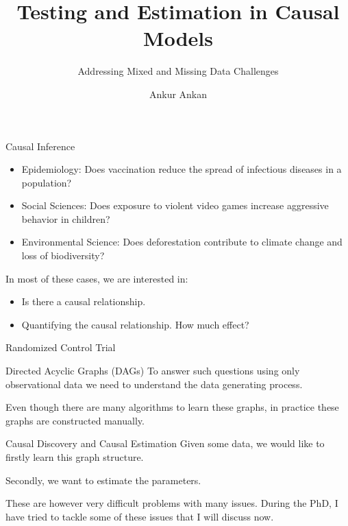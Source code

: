 \documentclass[aspectratio=169]{beamer}
\begin{document}
\title{Testing and Estimation in Causal Models}
\subtitle{Addressing Mixed and Missing Data Challenges}
\author{Ankur Ankan}
\date{}

\maketitle

\begin{frame}{Causal Inference}

	\begin{itemize}
		\item Epidemiology: Does vaccination reduce the spread of infectious diseases in a population?
		\item Social Sciences: Does exposure to violent video games increase aggressive behavior in children?
		\item Environmental Science: Does deforestation contribute to climate change and loss of biodiversity?
	\end{itemize}

	In most of these cases, we are interested in:
	\begin{itemize}
		\item Is there a causal relationship.
		\item Quantifying the causal relationship. How much effect?
	\end{itemize}
\end{frame}

\begin{frame}{Randomized Control Trial}

\end{frame}

\begin{frame}{Directed Acyclic Graphs (DAGs)}
	To answer such questions using only observational data we need to understand the data generating process.


	Even though there are many algorithms to learn these graphs, in practice these graphs are constructed manually.
\end{frame}

\begin{frame}{Causal Discovery and Causal Estimation}
	Given some data, we would like to firstly learn this graph structure.

	Secondly, we want to estimate the parameters.

	These are however very difficult problems with many issues. 
	During the PhD, I have tried to tackle some of these issues that I will discuss now.
\end{frame}
\end{document}
